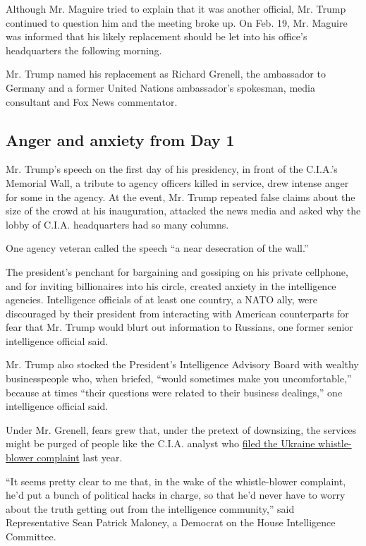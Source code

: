 Although Mr. Maguire tried to explain that it was another official, Mr.
Trump continued to question him and the meeting broke up. On Feb. 19,
Mr. Maguire was informed that his likely replacement should be let into
his office's headquarters the following morning.

Mr. Trump named his replacement as Richard Grenell, the ambassador to
Germany and a former United Nations ambassador's spokesman, media
consultant and Fox News commentator.

\hypertarget{anger-and-anxiety-from-day-1}{%
\subsection{Anger and anxiety from Day
1}\label{anger-and-anxiety-from-day-1}}

Mr. Trump's speech on the first day of his presidency, in front of the
C.I.A.'s Memorial Wall, a tribute to agency officers killed in service,
drew intense anger for some in the agency. At the event, Mr. Trump
repeated false claims about the size of the crowd at his inauguration,
attacked the news media and asked why the lobby of C.I.A. headquarters
had so many columns.

One agency veteran called the speech ``a near desecration of the wall.''

The president's penchant for bargaining and gossiping on his private
cellphone, and for inviting billionaires into his circle, created
anxiety in the intelligence agencies. Intelligence officials of at least
one country, a NATO ally, were discouraged by their president from
interacting with American counterparts for fear that Mr. Trump would
blurt out information to Russians, one former senior intelligence
official said.

Mr. Trump also stocked the President's Intelligence Advisory Board with
wealthy businesspeople who, when briefed, ``would sometimes make you
uncomfortable,'' because at times ``their questions were related to
their business dealings,'' one intelligence official said.

Under Mr. Grenell, fears grew that, under the pretext of downsizing, the
services might be purged of people like the C.I.A. analyst who
\href{https://www.nytimes.com/2019/11/26/us/politics/trump-whistle-blower-complaint-ukraine.html}{filed
the Ukraine whistle-blower complaint} last year.

``It seems pretty clear to me that, in the wake of the whistle-blower
complaint, he'd put a bunch of political hacks in charge, so that he'd
never have to worry about the truth getting out from the intelligence
community,'' said Representative Sean Patrick Maloney, a Democrat on the
House Intelligence Committee.


